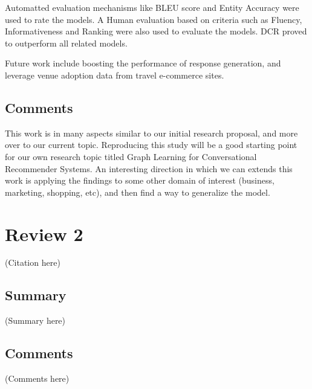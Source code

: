 \documentclass{article}
\begin{document}
Automatted evaluation mechanisms like BLEU score and Entity Accuracy 
were used to rate the models. A Human evaluation based on criteria such 
as Fluency, Informativeness and Ranking were also used to evaluate the models. 
DCR proved to outperform all related models. 

Future work include boosting the performance of response generation, and 
leverage venue adoption data from travel e-commerce sites.

\subsection*{Comments}
This work is in many aspects similar to our initial research proposal, and 
more over to our current topic. Reproducing this study will be a good 
starting point for our own research topic titled Graph Learning for 
Conversational Recommender Systems.  An interesting direction in which 
we can extends this work is applying the findings to some other 
domain of interest (business, marketing, shopping, etc), and then 
find a way to generalize the model.

\section*{Review 2}
(Citation here) 

\subsection*{Summary}
(Summary here)

\subsection*{Comments}
(Comments here)
\end{document}

